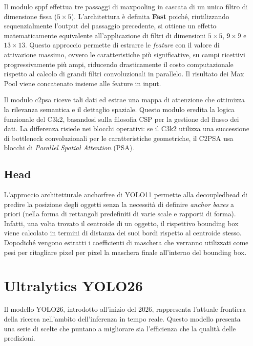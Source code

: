 \documentclass[../main.tex]{subfiles}
\begin{document}
\vspace{\baselineskip}
\noindent
Il modulo \gls{sppf} effettua tre passaggi di \gls{maxpooling} in cascata di un unico filtro di dimensione fissa ($5 \times 5$). L'architettura è definita \textbf{Fast} poiché, riutilizzando sequenzialmente l'output del passaggio precedente, si ottiene un effetto matematicamente equivalente all'applicazione di filtri di dimensioni $5 \times 5$, $9 \times 9$ e $13 \times 13$. Questo approccio permette di estrarre le \textit{feature} con il valore di attivazione massimo, ovvero le caratteristiche più significative, su campi ricettivi progressivamente più ampi, riducendo drasticamente il costo computazionale rispetto al calcolo di grandi filtri convoluzionali in parallelo. Il risultato dei Max Pool viene concatenato insieme alle feature in input.

\vspace{\baselineskip}
\noindent
Il modulo \gls{c2psa} riceve tali dati ed estrae una mappa di attenzione che ottimizza la rilevanza semantica e il dettaglio spaziale. Questo modulo eredita la logica funzionale del C3k2, basandosi sulla filosofia CSP per la gestione del flusso dei dati. La differenza risiede nei blocchi operativi: se il C3k2 utilizza una successione di \gls{bottleneck} convoluzionali per le caratteristiche geometriche, il C2PSA usa blocchi di \textit{Parallel Spatial Attention} (PSA).

\subsection{Head}
L'approccio architetturale \gls{anchorfree} di YOLO11 permette alla \gls{decoupledhead} di predire la posizione degli oggetti senza la necessità di definire \textit{anchor boxes} a priori (nella forma di rettangoli predefiniti di varie scale e rapporti di forma). Infatti, una volta trovato il centroide di un oggetto, il rispettivo bounding box viene calcolato in termini di distanza dei suoi bordi rispetto al centroide stesso. Dopodiché vengono estratti i coefficienti di maschera che verranno utilizzati come pesi per ritagliare pixel per pixel la maschera finale all'interno del bounding box.

\clearpage

\section{Ultralytics YOLO26}

Il modello YOLO26, introdotto all'inizio del 2026, rappresenta l'attuale frontiera della ricerca nell'ambito dell'inferenza in tempo reale. Questo modello presenta una serie di scelte che puntano a migliorare sia l'efficienza che la qualità delle predizioni.
\end{document}
